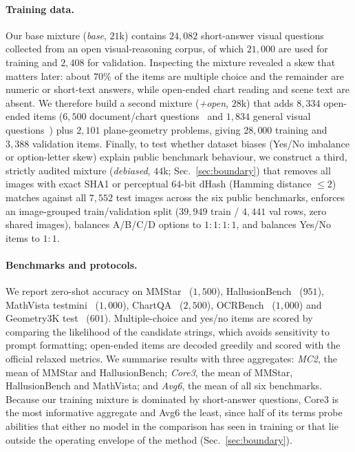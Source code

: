 \documentclass[10pt,twocolumn,letterpaper]{article}
\begin{document}
\paragraph{Training data.}
Our base mixture (\emph{base}, $21$k) contains $24{,}082$ short-answer visual
questions collected from an open visual-reasoning corpus, of which $21{,}000$
are used for training and $2{,}408$ for validation. Inspecting the mixture
revealed a skew that matters later: about $70\%$ of the items are multiple
choice and the remainder are numeric or short-text answers, while open-ended
chart reading and scene text are absent. We therefore build a second mixture
(\emph{+open}, $28$k) that adds $8{,}334$ open-ended items ($6{,}500$
document/chart questions~\citep{mathew2021docvqa} and $1{,}834$ general visual
questions~\citep{hudson2019gqa}) plus $2{,}101$ plane-geometry problems,
giving $28{,}000$ training and $3{,}388$ validation items. Finally, to test
whether dataset biases (Yes/No imbalance or option-letter skew) explain public
benchmark behaviour, we construct a third, strictly audited mixture
(\emph{debiased}, $44$k; Sec.~\ref{sec:boundary}) that removes all images with
exact SHA1 or perceptual $64$-bit dHash (Hamming distance ${\le}2$) matches
against all $7{,}552$ test images across the six public benchmarks, enforces an
image-grouped train/validation split ($39{,}949$ train / $4{,}441$ val rows,
zero shared images), balances A/B/C/D options to $1{:}1{:}1{:}1$, and balances
Yes/No items to $1{:}1$.

\paragraph{Benchmarks and protocols.}
We report zero-shot accuracy on MMStar~\citep{chen2024mmstar} ($1{,}500$),
HallusionBench~\citep{guan2024hallusionbench} ($951$),
MathVista testmini~\citep{lu2024mathvista} ($1{,}000$),
ChartQA~\citep{masry2022chartqa} ($2{,}500$),
OCRBench~\citep{liu2023ocrbench} ($1{,}000$) and Geometry3K
test~\citep{lu2021geometry3k} ($601$). Multiple-choice and yes/no items are
scored by comparing the likelihood of the candidate strings, which avoids
sensitivity to prompt formatting; open-ended items are decoded greedily and
scored with the official relaxed metrics. We summarise results with three
aggregates: \emph{MC2}, the mean of MMStar and HallusionBench; \emph{Core3},
the mean of MMStar, HallusionBench and MathVista; and \emph{Avg6}, the mean of
all six benchmarks. Because our training mixture is dominated by short-answer
questions, Core3 is the most informative aggregate and Avg6 the least, since
half of its terms probe abilities that either no model in the comparison has
seen in training or that lie outside the operating envelope of the method
(Sec.~\ref{sec:boundary}).
\end{document}
